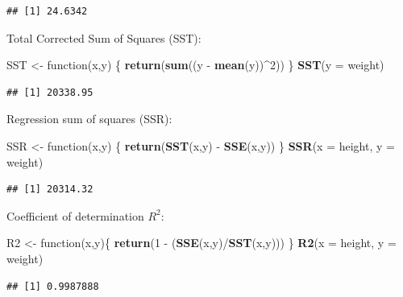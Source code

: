 \documentclass[]{article}
\newenvironment{Shaded}{\begin{snugshade}}{\end{snugshade}}
\newcommand{\KeywordTok}[1]{\textcolor[rgb]{0.13,0.29,0.53}{\textbf{{#1}}}}
\newcommand{\DataTypeTok}[1]{\textcolor[rgb]{0.13,0.29,0.53}{{#1}}}
\newcommand{\DecValTok}[1]{\textcolor[rgb]{0.00,0.00,0.81}{{#1}}}
\newcommand{\StringTok}[1]{\textcolor[rgb]{0.31,0.60,0.02}{{#1}}}
\newcommand{\NormalTok}[1]{{#1}}
\begin{document}
\begin{verbatim}
## [1] 24.6342
\end{verbatim}

Total Corrected Sum of Squares (SST):

\begin{Shaded}
\begin{Highlighting}[]
\NormalTok{SST <-}\StringTok{ }\NormalTok{function(x,y) \{}
    \KeywordTok{return}\NormalTok{(}\KeywordTok{sum}\NormalTok{((y -}\StringTok{ }\KeywordTok{mean}\NormalTok{(y))^}\DecValTok{2}\NormalTok{))}
\NormalTok{\}}
\KeywordTok{SST}\NormalTok{(}\DataTypeTok{y =} \NormalTok{weight)}
\end{Highlighting}
\end{Shaded}

\begin{verbatim}
## [1] 20338.95
\end{verbatim}

Regression sum of squares (SSR):

\begin{Shaded}
\begin{Highlighting}[]
\NormalTok{SSR <-}\StringTok{ }\NormalTok{function(x,y) \{}
    \KeywordTok{return}\NormalTok{(}\KeywordTok{SST}\NormalTok{(x,y) -}\StringTok{ }\KeywordTok{SSE}\NormalTok{(x,y))}
\NormalTok{\}}
\KeywordTok{SSR}\NormalTok{(}\DataTypeTok{x =} \NormalTok{height, }\DataTypeTok{y =} \NormalTok{weight)}
\end{Highlighting}
\end{Shaded}

\begin{verbatim}
## [1] 20314.32
\end{verbatim}

Coefficient of determination \(R^2\):

\begin{Shaded}
\begin{Highlighting}[]
\NormalTok{R2 <-}\StringTok{ }\NormalTok{function(x,y)\{}
  \KeywordTok{return}\NormalTok{(}\DecValTok{1} \NormalTok{-}\StringTok{ }\NormalTok{(}\KeywordTok{SSE}\NormalTok{(x,y)/}\KeywordTok{SST}\NormalTok{(x,y)))}
\NormalTok{\}}
\KeywordTok{R2}\NormalTok{(}\DataTypeTok{x =} \NormalTok{height, }\DataTypeTok{y =} \NormalTok{weight)}
\end{Highlighting}
\end{Shaded}

\begin{verbatim}
## [1] 0.9987888
\end{verbatim}
\end{document}
